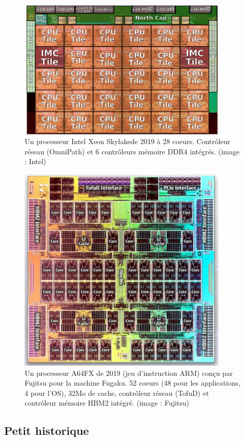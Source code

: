 \begin{figure}
  \centering
  \includegraphics[width=10cm]{skylake-sp_xcc_die_shot.png}
  \caption{Un processeur Intel Xeon \og Skylake\fg de 2019 à 28
    coeurs. Contrôleur réseau (OmniPath) et 6 contrôleurs mémoire DDR4
    intégrés. (image : Intel) \label{fig:grosXeon}}
\end{figure}

\begin{figure}
  \centering
  \includegraphics[width=10cm]{fujitsu-a64fx-block-diagram.jpg}
  \caption{Un processeur A64FX de 2019 (jeu d'instruction ARM) conçu par Fujitsu
    pour la machine \og Fugaku\fg. 52 coeurs (48 pour les applications, 4 pour
    l'OS), 32Mo de cache, contrôleur réseau (TofuD) et contrôleur mémoire HBM2
    intégré. (image : Fujitsu)~\label{fig:A64FX}}
\end{figure}

\subsection{Petit historique}

